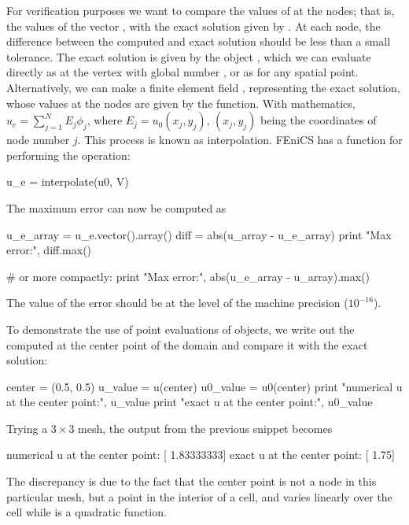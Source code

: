 For verification purposes we want to compare the values of
  at the nodes; that is, the values of the
vector , with the exact solution
given by . At each node, the
difference between the computed and exact solution should be less than
a small tolerance. The exact solution is given by the
 object
, which we can evaluate directly as
 at the vertex with global
number , or as
 for any spatial point.
Alternatively, we can make a finite element field
, representing the exact solution,
whose values at the nodes are given by the
 function. With mathematics, $u_e =
\sum_{j=1}^N E_j\phi_j$, where $E_j=u_0(x_j,y_j)$, $(x_j,y_j)$ being
the coordinates of node number $j$.  This process is known as
interpolation. FEniCS
has a function for performing the operation:
\begin{python}
u_e = interpolate(u0, V)
\end{python}
The maximum error can now be computed as
\begin{python}
u_e_array = u_e.vector().array()
diff = abs(u_array - u_e_array)
print "Max error:", diff.max()

# or more compactly:
print "Max error:", abs(u_e_array - u_array).max()
\end{python}
The value of the error should be at the level of the machine precision
($10^{-16}$).

To demonstrate the use of point evaluations of
 objects, we write out the
computed  at the center point of the
domain and compare it with the exact solution:
\begin{python}
center = (0.5, 0.5)
u_value = u(center)
u0_value = u0(center)
print "numerical u at the center point:", u_value
print "exact     u at the center point:", u0_value
\end{python}
Trying a $3\times 3$ mesh, the output from the
previous snippet becomes
\begin{progoutput}
numerical u at the center point: [ 1.83333333]
exact     u at the center point: [ 1.75]
\end{progoutput}
\noindent
The discrepancy is due to the fact that the center point is not a node
in this particular mesh, but a point in the interior of a cell, and
 varies linearly over the cell while
 is a quadratic function.

